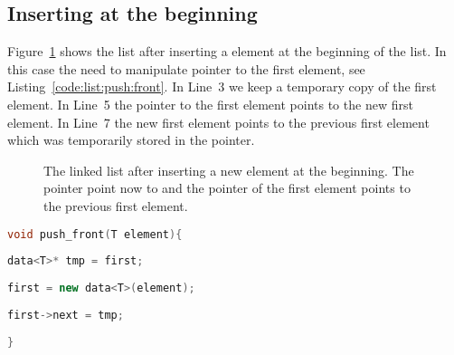 \documentclass[11pt,fleqn]{book} %
\begin{document}
\subsection*{Inserting at the beginning}

Figure~\ref{fig:sketch:linked:list:push_front} shows the list after inserting a element at the beginning of the list. In this case the need to manipulate pointer  to the first element, see Listing~\ref{code:list:push:front}. In Line~3 we keep a temporary copy  of the first element. In Line~5 the pointer to the first element points to the new first element. In Line~7 the new first element points to the previous first element which was temporarily stored in the  pointer.


\begin{figure}[h]
\centering
{}
\caption{The linked list after inserting a new element at the beginning. The pointer  point now to  and the pointer  of the first element points to the previous first element.}
\label{fig:sketch:linked:list:push_front}
\end{figure}

\begin{lstlisting}[language=c++,caption={Implementation of the \cpp{push_back} function of a linked list.\label{code:list:push:front}},float,floatplacement=tb]
void push_front(T element){
    
data<T>* tmp = first;
    
first = new data<T>(element);
    
first->next = tmp; 
    
}
\end{lstlisting}

\end{document}
